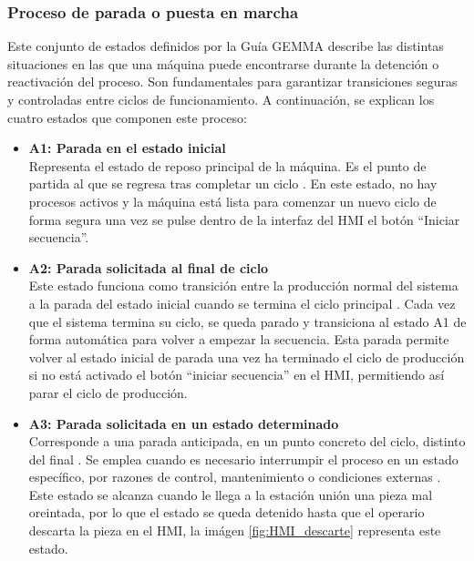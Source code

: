 \subsubsection{Proceso de parada o puesta en marcha}

Este conjunto de estados definidos por la Guía GEMMA describe las distintas situaciones en las que una máquina puede encontrarse durante la detención o reactivación del proceso. Son fundamentales para garantizar transiciones seguras y controladas entre ciclos de funcionamiento. A continuación, se explican los cuatro estados que componen este proceso:

\begin{itemize}
    \item \textbf{A1: Parada en el estado inicial} \\
    Representa el estado de reposo principal de la máquina. Es el punto de partida al que se regresa tras completar un ciclo \cite{guia_gemma}. En este estado, no hay procesos activos y la máquina está lista para comenzar un nuevo ciclo de forma segura una vez se pulse dentro de la interfaz del HMI el botón ``Iniciar secuencia''.

    \item \textbf{A2: Parada solicitada al final de ciclo} \\
    Este estado funciona como transición entre la producción normal del sistema a la parada del estado inicial cuando se termina el ciclo principal \cite{guia_gemma}. Cada vez que el sistema termina su ciclo, se queda parado y transiciona al estado A1 de forma automática para volver a empezar la secuencia. Esta parada permite volver al estado inicial de parada una vez ha terminado el ciclo de producción si no está activado el botón ``iniciar secuencia'' en el HMI, permitiendo así parar el ciclo de producción.
    
    \item \textbf{A3: Parada solicitada en un estado determinado} \\
    Corresponde a una parada anticipada, en un punto concreto del ciclo, distinto del final \cite{guia_gemma}. Se emplea cuando es necesario interrumpir el proceso en un estado específico, por razones de control, mantenimiento o condiciones externas \cite{guia_gemma}. Este estado se alcanza cuando le llega a la estación unión una pieza mal oreintada, por lo que el estado se queda detenido hasta que el operario descarta la pieza en el HMI, la imágen \ref{fig:HMI_descarte} representa este estado.


\end{itemize}
